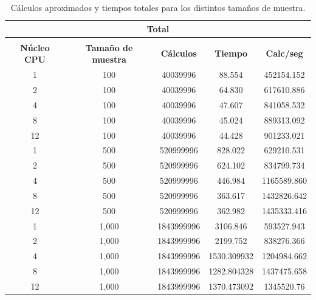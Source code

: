 \begin{table}[]
	\centering
	\begin{tabular}{|c|c|c|c|c|}
		\hline
		\multicolumn{5}{|c|}{\cellcolor[HTML]{DAE8FC}\textbf{Total}} \\ \hline
		\cellcolor[HTML]{DAE8FC} &
		\cellcolor[HTML]{DAE8FC} &
		\cellcolor[HTML]{DAE8FC} &
		\cellcolor[HTML]{DAE8FC} &
		\cellcolor[HTML]{DAE8FC} \\
		\multirow{-2}{*}{\cellcolor[HTML]{DAE8FC}\textbf{Núcleo CPU}} &
		\multirow{-2}{*}{\cellcolor[HTML]{DAE8FC}\textbf{Tamaño de muestra}} &
		\multirow{-2}{*}{\cellcolor[HTML]{DAE8FC}\textbf{Cálculos}} &
		\multirow{-2}{*}{\cellcolor[HTML]{DAE8FC}\textbf{Tiempo}} &
		\multirow{-2}{*}{\cellcolor[HTML]{DAE8FC}\textbf{Calc/seg}} \\ \hline
		1    & 100     & 40039996     & 88.554        & 452154.152   \\ \hline
		2    & 100     & 40039996     & 64.830        & 617610.886   \\ \hline
		4    & 100     & 40039996     & 47.607        & 841058.532   \\ \hline
		8    & 100     & 40039996     & 45.024        & 889313.092   \\ \hline
		12   & 100     & 40039996     & 44.428        & 901233.021   \\ \hline
		1    & 500     & 520999996    & 828.022       & 629210.531   \\ \hline
		2    & 500     & 520999996    & 624.102       & 834799.734   \\ \hline
		4    & 500     & 520999996    & 446.984       & 1165589.860  \\ \hline
		8    & 500     & 520999996    & 363.617       & 1432826.642  \\ \hline
		12   & 500     & 520999996    & 362.982       & 1435333.416  \\ \hline
		1    & 1,000   & 1843999996   & 3106.846      & 593527.943   \\ \hline
		2    & 1,000   & 1843999996   & 2199.752      & 838276.366   \\ \hline
		4    & 1,000   & 1843999996   & 1530.309932   & 1204984.662  \\ \hline
		8    & 1,000   & 1843999996   & 1282.804328   & 1437475.658  \\ \hline
		12   & 1,000   & 1843999996   & 1370.473092   & 1345520.76   \\ \hline
	\end{tabular}
	\caption{Cálculos aproximados y tiempos totales para los distintos tamaños de muestra.}
	\label{tab:calc-total}
\end{table}


